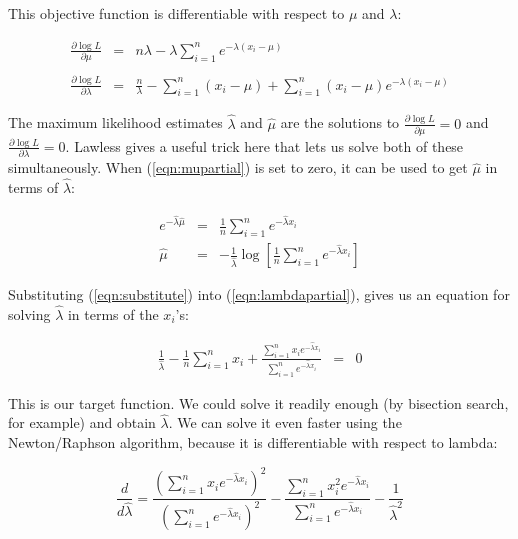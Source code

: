 This objective function is differentiable with respect to $\mu$ and
$\lambda$:

\begin{eqnarray}
\frac{\partial \log L}{\partial \mu} & = &
n \lambda - \lambda \sum_{i=1}^{n} e^{-\lambda (x_i - \mu)}\\%
\\%
\label{eqn:mupartial}
\frac{\partial \log L}{\partial \lambda} & = &
\frac{n}{\lambda} - \sum_{i=1}^{n} (x_i - \mu) +  
\sum_{i=1}^{n} (x_i - \mu) e^{-\lambda (x_i - \mu)}
\label{eqn:lambdapartial}
\end{eqnarray}

The maximum likelihood estimates $\hat{\lambda}$ and $\hat{\mu}$ are
the solutions to $\frac{\partial \log L}{\partial \mu} = 0$ and
$\frac{\partial \log L}{\partial \lambda} = 0$. Lawless
\citep{Lawless82} gives a useful trick here that lets us solve both of
these simultaneously. When (\ref{eqn:mupartial}) is set to zero, it
can be used to get $\hat{\mu}$ in terms of $\hat{\lambda}$:

\begin{eqnarray}
e^{-\hat{\lambda} \hat{\mu}} & = & \frac{1}{n} \sum_{i=1}^{n} e^{-\hat{\lambda} x_i} 
\label{eqn:substitute}\\
\hat{\mu} & = & - \frac{1}{\hat{\lambda}} 
	\log \left[ \frac{1}{n} \sum_{i=1}^{n} e^{-\hat{\lambda} x_i} \right]
\label{eqn:solvemu}
\end{eqnarray}

Substituting (\ref{eqn:substitute}) into (\ref{eqn:lambdapartial}),
gives us an equation for solving $\hat{\lambda}$ in terms of the
$x_i$'s:

\begin{eqnarray}
\frac{1}{\hat{\lambda}} - \frac{1}{n} \sum_{i=1}^{n} x_i +
\frac{\sum_{i=1}^{n} x_i e^{-\hat{\lambda} x_i}}
     {\sum_{i=1}^{n} e^{-\hat{\lambda} x_i}} 
& = & 0
\label{eqn:newtontarget}
\end{eqnarray}

This is our target function. We could solve it readily enough (by
bisection search, for example) and obtain $\hat{\lambda}$. We can
solve it even faster using the Newton/Raphson algorithm, because it is
differentiable with respect to lambda:

\begin{equation}
\frac{d}{d\hat{\lambda}} = 
\frac{\left( \sum_{i=1}^{n} x_i e^{-\hat{\lambda} x_i} \right)^2 } 
     {\left( \sum_{i=1}^{n} e^{-\hat{\lambda} x_i}     \right)^2 }
-
\frac{\sum_{i=1}^{n} x_i^2 e^{-\hat{\lambda} x_i}}
     {\sum_{i=1}^{n} e^{-\hat{\lambda} x_i}}
-
\frac{1}{\hat{\lambda}^2}
\label{eqn:newtonderivative}
\end{equation}

